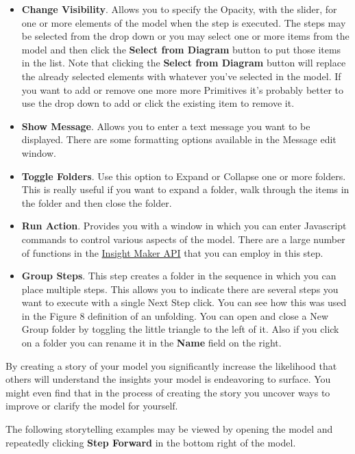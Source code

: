 \documentclass[]{memoir}
\begin{document}
\begin{itemize}
\itemsep1pt\parskip0pt
\item
  \textbf{Change Visibility}. Allows you to specify the Opacity, with
  the slider, for one or more elements of the model when the step is
  executed. The steps may be selected from the drop down or you may
  select one or more items from the model and then click the
  \textbf{Select from Diagram} button to put those items in the list.
  Note that clicking the \textbf{Select from Diagram} button will
  replace the already selected elements with whatever you've selected in
  the model. If you want to add or remove one more more Primitives it's
  probably better to use the drop down to add or click the existing item
  to remove it.
\item
  \textbf{Show Message}. Allows you to enter a text message you want to
  be displayed. There are some formatting options available in the
  Message edit window.
\item
  \textbf{Toggle Folders}. Use this option to Expand or Collapse one or
  more folders. This is really useful if you want to expand a folder,
  walk through the items in the folder and then close the folder.
\item
  \textbf{Run Action}. Provides you with a window in which you can enter
  Javascript commands to control various aspects of the model. There are
  a large number of functions in the
  \href{http://insightmaker.com/sites/default/files/API/files/API-js.html}{Insight
  Maker API} that you can employ in this step.
\item
  \textbf{Group Steps}. This step creates a folder in the sequence in
  which you can place multiple steps. This allows you to indicate there
  are several steps you want to execute with a single Next Step click.
  You can see how this was used in the Figure 8 definition of an
  unfolding. You can open and close a New Group folder by toggling the
  little triangle to the left of it. Also if you click on a folder you
  can rename it in the \textbf{Name} field on the right.
\end{itemize}

By creating a story of your model you significantly increase the
likelihood that others will understand the insights your model is
endeavoring to surface. You might even find that in the process of
creating the story you uncover ways to improve or clarify the model for
yourself.

The following storytelling examples may be viewed by opening the model
and repeatedly clicking \textbf{Step Forward} in the bottom right of the
model.
\end{document}
